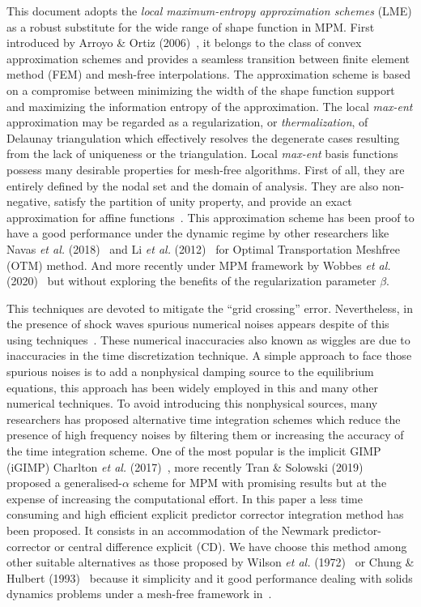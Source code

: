 This document adopts the \textit{local maximum-entropy approximation
    schemes} (LME) as a robust substitute for the wide range of shape
  function in MPM. First introduced by Arroyo \& Ortiz
(2006)~\cite{Arroyo2006}, it belongs to the class of convex 
approximation schemes and provides a seamless transition between
finite element method (FEM) and mesh-free interpolations. The
approximation scheme is based on a compromise between minimizing the
width of the shape function support and maximizing the information
entropy of the approximation. The local \textit{max-ent} approximation
may be regarded as a regularization, or \textit{thermalization}, of
Delaunay triangulation which effectively resolves the degenerate cases
resulting from the lack of uniqueness or the triangulation. Local
\textit{max-ent} basis functions possess many desirable properties for
mesh-free algorithms. First of all, they are entirely defined by the
nodal set and the domain of analysis. They are also non-negative,
satisfy the partition of unity property, and provide an exact
approximation for affine functions~\cite{Arroyo2006}. This
approximation scheme has been proof to have a good performance under
the dynamic regime by other researchers like Navas {\it et al.}
(2018)~\cite{Navas2018a} and Li {\it et al.} (2012)~\cite{Li2012} for
Optimal Transportation Meshfree (OTM) method. And more
recently under MPM framework by Wobbes {\it et
  al.}(2020)~\cite{Wobbes2020} but without exploring the benefits of
the regularization parameter $\beta$.

This techniques are devoted to mitigate the
``grid crossing'' error. Nevertheless, in the presence of shock waves spurious
numerical noises appears despite of this using
techniques~\cite{Tran2019e}. These numerical inaccuracies also known
as wiggles are due to inaccuracies in the time discretization technique.
A simple approach to face those spurious noises is to add a
nonphysical damping source to the equilibrium equations, this
approach has been widely employed in this and many other numerical
techniques. To avoid introducing this nonphysical sources, many
researchers has proposed alternative time integration
schemes which reduce the presence of high frequency noises by
filtering them or increasing the accuracy of the time integration
scheme. One of the most popular is the implicit GIMP (iGIMP)
Charlton {\it et al.} (2017)~\cite{Charlton2017}, more recently Tran \&
Solowski (2019)~\cite{Tran2019e} proposed a generalised-$\alpha$ scheme
for MPM with promising results but at the expense of increasing
the computational effort. In this paper a less time consuming and high
efficient explicit predictor corrector integration method has been
proposed. It consists in an accommodation of the Newmark
predictor-corrector or central difference explicit (CD). We have
choose this method among other suitable alternatives as those proposed
by Wilson {\it et al.} (1972)~\cite{Wilson1972} or Chung \& Hulbert
(1993)~\cite{Geranlized_alpha_1993} because it simplicity and it good
performance dealing with solids dynamics problems under a mesh-free
framework in~\cite{Navas2018a}.


